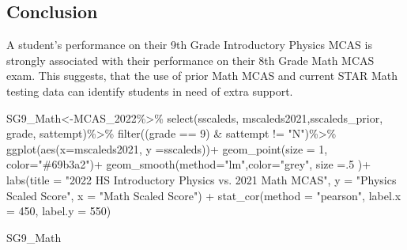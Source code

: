 \documentclass[
  letterpaper,
  DIV=11,
  numbers=noendperiod]{scrartcl}
\newenvironment{Shaded}{\begin{snugshade}}{\end{snugshade}}
\newcommand{\AttributeTok}[1]{\textcolor[rgb]{0.40,0.45,0.13}{#1}}
\newcommand{\DecValTok}[1]{\textcolor[rgb]{0.68,0.00,0.00}{#1}}
\newcommand{\FunctionTok}[1]{\textcolor[rgb]{0.28,0.35,0.67}{#1}}
\newcommand{\NormalTok}[1]{\textcolor[rgb]{0.00,0.23,0.31}{#1}}
\newcommand{\OtherTok}[1]{\textcolor[rgb]{0.00,0.23,0.31}{#1}}
\newcommand{\SpecialCharTok}[1]{\textcolor[rgb]{0.37,0.37,0.37}{#1}}
\newcommand{\StringTok}[1]{\textcolor[rgb]{0.13,0.47,0.30}{#1}}
\begin{document}
\hypertarget{conclusion}{%
\subsection{Conclusion}\label{conclusion}}

A student's performance on their 9th Grade Introductory Physics MCAS is
strongly associated with their performance on their 8th Grade Math MCAS
exam. This suggests, that the use of prior Math MCAS and current STAR
Math testing data can identify students in need of extra support.

\begin{Shaded}
\begin{Highlighting}[]
\NormalTok{SG9\_Math}\OtherTok{\textless{}{-}}\NormalTok{MCAS\_2022}\SpecialCharTok{\%\textgreater{}\%}
  \FunctionTok{select}\NormalTok{(sscaleds, mscaleds2021,sscaleds\_prior, grade, sattempt)}\SpecialCharTok{\%\textgreater{}\%}
  \FunctionTok{filter}\NormalTok{((grade }\SpecialCharTok{==} \DecValTok{9}\NormalTok{) }\SpecialCharTok{\&}\NormalTok{ sattempt }\SpecialCharTok{!=} \StringTok{"N"}\NormalTok{)}\SpecialCharTok{\%\textgreater{}\%}
  \FunctionTok{ggplot}\NormalTok{(}\FunctionTok{aes}\NormalTok{(}\AttributeTok{x=}\StringTok{\textasciigrave{}}\AttributeTok{mscaleds2021}\StringTok{\textasciigrave{}}\NormalTok{, }\AttributeTok{y =}\StringTok{\textasciigrave{}}\AttributeTok{sscaleds}\StringTok{\textasciigrave{}}\NormalTok{))}\SpecialCharTok{+} 
     \FunctionTok{geom\_point}\NormalTok{(}\AttributeTok{size =} \DecValTok{1}\NormalTok{, }\AttributeTok{color=}\StringTok{"\#69b3a2"}\NormalTok{)}\SpecialCharTok{+}
 \FunctionTok{geom\_smooth}\NormalTok{(}\AttributeTok{method=}\StringTok{"lm"}\NormalTok{,}\AttributeTok{color=}\StringTok{"grey"}\NormalTok{, }\AttributeTok{size =}\NormalTok{.}\DecValTok{5}\NormalTok{ )}\SpecialCharTok{+}
  \FunctionTok{labs}\NormalTok{(}\AttributeTok{title =} \StringTok{"2022 HS Introductory Physics vs. 2021 Math MCAS"}\NormalTok{, }\AttributeTok{y =} \StringTok{"Physics Scaled Score"}\NormalTok{,}
       \AttributeTok{x =} \StringTok{"Math Scaled Score"}\NormalTok{) }\SpecialCharTok{+} 
  \FunctionTok{stat\_cor}\NormalTok{(}\AttributeTok{method =} \StringTok{"pearson"}\NormalTok{, }\AttributeTok{label.x =} \DecValTok{450}\NormalTok{, }\AttributeTok{label.y =} \DecValTok{550}\NormalTok{)}

\NormalTok{SG9\_Math}
\end{Highlighting}
\end{Shaded}
\end{document}
